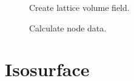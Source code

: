 \documentclass[fleqn,11pt,openany]{book}
\begin{document}
\begin{figure}[H]
\caption{Create lattice volume field.}
\label{fig:createnewfield}
\end{figure}

\begin{figure}[H]
\caption{Calculate node data.}
\label{fig:calcfielddata}
\end{figure}

\section{Isosurface}\label{isosurface2}
\end{document}
